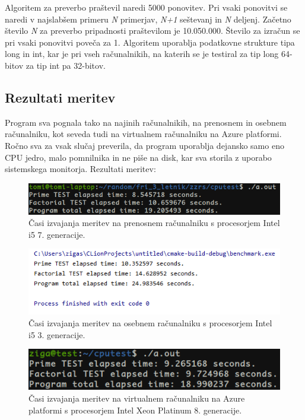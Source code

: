 Algoritem za preverbo praštevil naredi 5000 ponovitev. Pri vsaki ponovitvi se naredi v najslabšem primeru \textit{N} primerjav, \textit{N+1} seštevanj in \textit{N} deljenj. Začetno število \textit{N} za preverbo pripadnosti praštevilom je 10.050.000. Število za izračun se pri vsaki ponovitvi poveča za 1. Algoritem uporablja podatkovne strukture tipa long in int, kar je pri vseh računalnikih, na katerih se je testiral za tip long 64-bitov za tip int pa 32-bitov. 



\subsection{Rezultati meritev}

Program sva pognala tako na najinih računalnikih, na prenosnem in osebnem računalniku, kot seveda tudi na virtualnem računalniku na Azure platformi. Ročno sva za vsak slučaj preverila, da program uporablja dejansko samo eno CPU jedro, malo pomnilnika in ne piše na disk, kar sva storila z uporabo sistemskega monitorja. Rezultati meritev:

\begin{figure}[H]
	\centering
	\includegraphics[scale=0.66]{Img/T_cputest.png}
	\caption{Časi izvajanja meritev na prenosnem računalniku s procesorjem Intel i5 7. generacije.}
	\label{fig:7_breme2}
\end{figure}

\begin{figure}[H]
	\centering
	\includegraphics[scale=0.8]{Img/Z_cputest.png}
	\caption{Časi izvajanja meritev na osebnem računalniku s procesorjem Intel i5 3. generacije.}
	\label{fig:7_breme2}
\end{figure}

\begin{figure}[H]
	\centering
	\includegraphics[scale=0.66]{Img/Azure_cputest.png}
	\caption{Časi izvajanja meritev na virtualnem računalniku na Azure platformi s procesorjem Intel Xeon Platinum 8. generacije.}
	\label{fig:7_breme2}
\end{figure}

